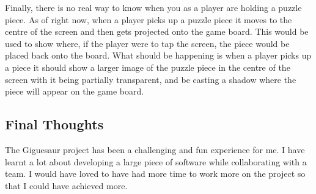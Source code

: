 \documentclass{article}
\begin{document}
Finally, there is no real way to know when you as a player are holding a puzzle
piece. As of right now, when a player picks up a puzzle piece it moves to the
centre of the screen and then gets projected onto the game board. This would be
used to show where, if the player were to tap the screen, the piece would be
placed back onto the board. What should be happening is when a player picks up a
piece it should show a larger image of the puzzle piece in the centre of the
screen with it being partially transparent, and be casting a shadow where the
piece will appear on the game board.

\subsection{Final Thoughts}
The Giguesaur project has been a challenging and fun experience for me. I have
learnt a lot about developing a large piece of software while collaborating with
a team. I would have loved to have had more time to work more on the project so
that I could have achieved more.


\clearpage





\clearpage
\printglossaries

\end{document}
